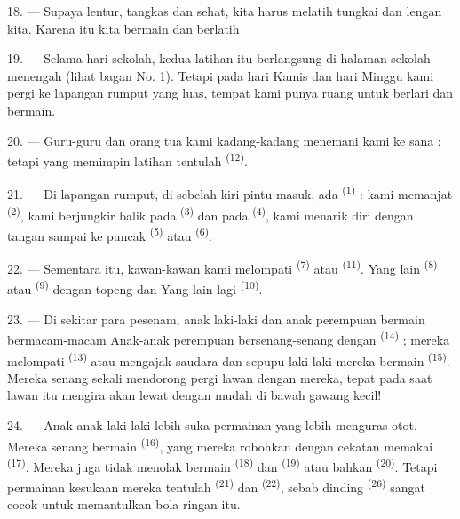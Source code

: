 \VUsaut{5.0mm}
\VUsaut{2.4mm}
\VUsaut{3.0mm}

18. --- Supaya lentur, tangkas dan sehat, kita harus melatih tungkai
dan lengan kita. Karena itu kita bermain dan berlatih 

19. --- Selama hari sekolah, kedua latihan itu berlangsung di halaman
sekolah menengah (lihat bagan No. 1). Tetapi pada hari Kamis dan hari
Minggu kami pergi ke lapangan rumput yang luas, tempat kami punya
ruang untuk berlari dan bermain.

20. --- Guru-guru dan orang tua kami kadang-kadang menemani kami ke
sana ; tetapi yang memimpin latihan tentulah \textsuperscript{(12)}.

21. --- Di lapangan rumput, di sebelah kiri pintu masuk, ada
\textsuperscript{(1)} : kami memanjat
\textsuperscript{(2)}, kami berjungkir balik pada
\textsuperscript{(3)} dan pada
\textsuperscript{(4)}, kami menarik diri dengan tangan
sampai ke puncak \textsuperscript{(5)} atau
\textsuperscript{(6)}.

22. --- Sementara itu, kawan-kawan kami melompati \textsuperscript{(7)} atau \textsuperscript{(11)}. Yang lain \textsuperscript{(8)}
atau \textsuperscript{(9)} dengan topeng dan
 Yang lain lagi \textsuperscript{(10)}.

\VUsaut{4.6mm}
\VUsaut{3.0mm}

23. --- Di sekitar para pesenam, anak laki-laki dan anak perempuan
bermain bermacam-macam  Anak-anak perempuan
bersenang-senang dengan \textsuperscript{(14)} ;
mereka melompati \textsuperscript{(13)} atau mengajak
saudara dan sepupu laki-laki mereka bermain
\textsuperscript{(15)}. Mereka senang sekali mendorong
pergi  lawan dengan  mereka, tepat pada
saat lawan itu mengira akan lewat dengan mudah di bawah gawang kecil!

24. --- Anak-anak laki-laki lebih suka permainan yang lebih menguras
otot. Mereka senang bermain \textsuperscript{(16)},
yang mereka robohkan dengan cekatan memakai
\textsuperscript{(17)}. Mereka juga tidak menolak bermain
\textsuperscript{(18)} dan
\textsuperscript{(19)} atau bahkan \textsuperscript{(20)}. Tetapi permainan kesukaan mereka
tentulah \textsuperscript{(21)} dan \textsuperscript{(22)}, sebab dinding \textsuperscript{(26)} sangat cocok untuk memantulkan bola ringan
itu.

